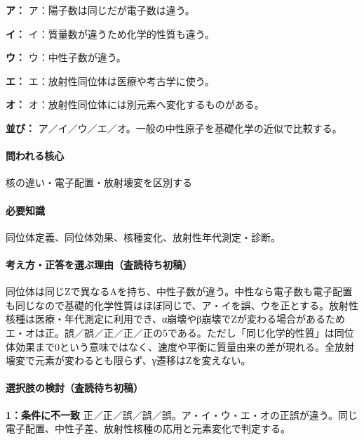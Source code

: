 \noindent\textbf{ア：} ア：陽子数は同じだが電子数は違う。\par

\noindent\textbf{イ：} イ：質量数が違うため化学的性質も違う。\par

\noindent\textbf{ウ：} ウ：中性子数が違う。\par

\noindent\textbf{エ：} エ：放射性同位体は医療や考古学に使う。\par

\noindent\textbf{オ：} オ：放射性同位体には別元素へ変化するものがある。\par

\noindent\textbf{並び：} ア／イ／ウ／エ／オ。一般の中性原子を基礎化学の近似で比較する。\par

\paragraph{問われる核心} 核の違い・電子配置・放射壊変を区別する

\paragraph{必要知識} 同位体定義、同位体効果、核種変化、放射性年代測定・診断。

\paragraph{考え方・正答を選ぶ理由（査読待ち初稿）} 同位体は同じZで異なるAを持ち、中性子数が違う。中性なら電子数も電子配置も同じなので基礎的化学性質はほぼ同じで、ア・イを誤、ウを正とする。放射性核種は医療・年代測定に利用でき、α崩壊やβ崩壊でZが変わる場合があるためエ・オは正。誤／誤／正／正／正の5である。ただし「同じ化学的性質」は同位体効果まで0という意味ではなく、速度や平衡に質量由来の差が現れる。全放射壊変で元素が変わるとも限らず、γ遷移はZを変えない。

\paragraph{選択肢の検討（査読待ち初稿）}\mbox{}\par

\noindent\textbf{1：条件に不一致} 正／正／誤／誤／誤。ア・イ・ウ・エ・オの正誤が違う。同じ電子配置、中性子差、放射性核種の応用と元素変化で判定する。\par

